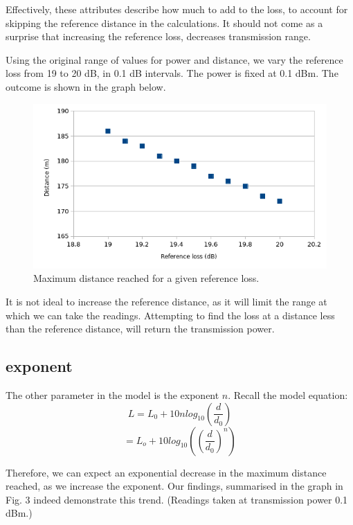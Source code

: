 \documentclass[11pt,journal]{article}
\begin{document}
	Effectively, these attributes describe how much to add to the loss, to account for skipping the reference distance in the calculations. It should not come as a surprise that increasing the reference loss, decreases transmission range. 
	
	Using the original range of values for power and distance, we vary the reference loss from 19 to 20 dB, in 0.1 dB intervals. The power is fixed at 0.1 dBm. The outcome is shown in the graph below.
	
	\begin{figure}[h]
		\centering
		\includegraphics[scale=0.6]{graph_log_refloss.png}
		\caption{Maximum distance reached for a given reference loss.}
	\end{figure}
	
	It is not ideal to increase the reference distance, as it will limit the range at which we can take the readings. Attempting to find the loss at a distance less than the reference distance, will return the transmission power.

	\subsection{exponent}
	The other parameter in the model is the exponent $n$. Recall the model equation:
		\[L = L_0 + 10nlog_{10}(\dfrac{d}{d_0})\] 
		\[ = L_o + 10log_{10}((\dfrac{d}{d_0})^n)\]
		
	Therefore, we can expect an exponential decrease in the maximum distance reached, as we increase the exponent. Our findings, summarised in the graph in Fig. 3 indeed demonstrate this trend. (Readings taken at transmission power 0.1 dBm.)
	
\end{document}
